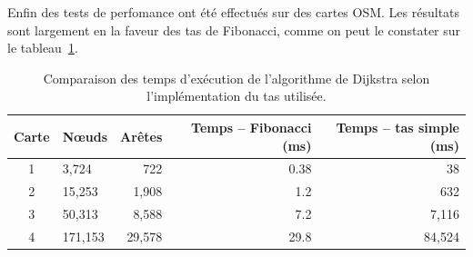 \documentclass{article}
\begin{document}
Enfin des tests de perfomance ont été effectués sur des cartes
OSM. Les résultats sont largement en la faveur des tas de Fibonacci,
comme on peut le constater sur le tableau~\ref{tab:comp_osm}.
\begin{table}[htbp]
      \centering
      \begin{tabular}{clrrr}
        Carte & Nœuds & Arêtes & Temps -- Fibonacci (ms) & Temps -- tas
                                                     simple (ms)\\
        \hline
        1 & 3,724 & 722 & 0.38 & 38 \\
        2 & 15,253 & 1,908 & 1.2 & 632 \\
        3 & 50,313 & 8,588 & 7.2   & 7,116 \\
        4 & 171,153 & 29,578 & 29.8 & 84,524
      \end{tabular}
      \caption{\label{tab:comp_osm}Comparaison des temps d'exécution de l'algorithme de
        Dijkstra selon l'implémentation du tas utilisée.} 
    \end{table}
\appendix
\end{document}
